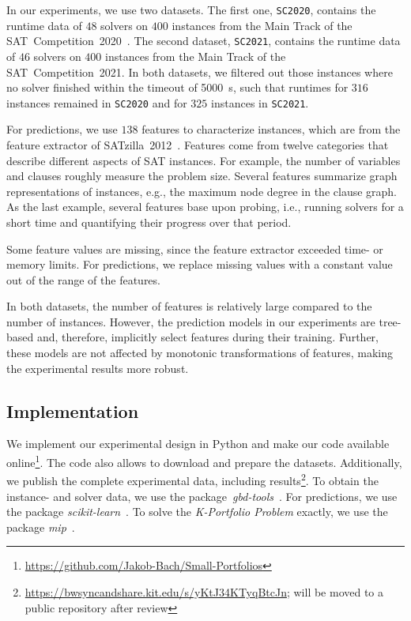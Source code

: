 \documentclass[a4paper,USenglish,pdfa]{lipics-v2021} %
\begin{document}
In our experiments, we use two datasets. 
The first one, \texttt{SC2020}, contains the runtime data of $48$ solvers on $400$ instances from the Main Track of the SAT~Competition~2020~\cite{balyo2020proceedings,SC2020:AIJ}.
The second dataset, \texttt{SC2021}, contains the runtime data of $46$ solvers on $400$ instances from the Main Track of the SAT~Competition~2021. 
In both datasets, we filtered out those instances where no solver finished within the timeout of 5000~s, such that runtimes for $316$ instances remained in \texttt{SC2020} and for $325$ instances in \texttt{SC2021}.

For predictions, we use $138$ features to characterize instances, which are from the feature extractor of SATzilla~2012~\cite{xu2012features}. 
Features come from twelve categories that describe different aspects of SAT instances.
For example, the number of variables and clauses roughly measure the problem size.
Several features summarize graph representations of instances, e.g., the maximum node degree in the clause graph.
As the last example, several features base upon probing, i.e., running solvers for a short time and quantifying their progress over that period.

Some feature values are missing, since the feature extractor exceeded time- or memory limits.
For predictions, we replace missing values with a constant value out of the range of the features.

In both datasets, the number of features is relatively large compared to the number of instances.
However, the prediction models in our experiments are tree-based and, therefore, implicitly select features during their training.
Further, these models are not affected by monotonic transformations of features, making the experimental results more robust.

\subsection{Implementation}
\label{sec:experimental-design:impl}

We implement our experimental design in Python and make our code available online\footnote{\url{https://github.com/Jakob-Bach/Small-Portfolios}}.
The code also allows to download and prepare the datasets.
Additionally, we publish the complete experimental data, including results\footnote{\url{https://bwsyncandshare.kit.edu/s/yKtJ34KTyqBtcJn}; will be moved to a public repository after review}.
To obtain the instance- and solver data, we use the package~\emph{gbd-tools}~\cite{iser2020collaborative}.
For predictions, we use the package \emph{scikit-learn}~\cite{scikit-learn}.
To solve the \emph{K-Portfolio Problem} exactly, we use the package \emph{mip}~\cite{python-mip}.
\end{document}
